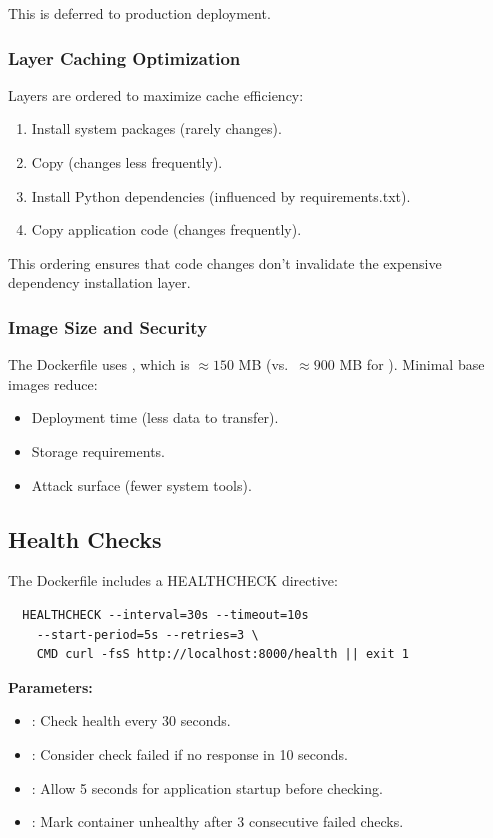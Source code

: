 This is deferred to production deployment.

\subsubsection{Layer Caching Optimization}

Layers are ordered to maximize cache efficiency:

\begin{enumerate}
  \item Install system packages (rarely changes).
  \item Copy  (changes less frequently).
  \item Install Python dependencies (influenced by requirements.txt).
  \item Copy application code (changes frequently).
\end{enumerate}

This ordering ensures that code changes don't invalidate the expensive dependency installation layer.

\subsubsection{Image Size and Security}

The Dockerfile uses , which is $\approx 150$ MB (vs.~$\approx 900$ MB for ). 
Minimal base images reduce:

\begin{itemize}
  \item Deployment time (less data to transfer).
  \item Storage requirements.
  \item Attack surface (fewer system tools).
\end{itemize}

\subsection{Health Checks}

The Dockerfile includes a HEALTHCHECK directive:

\begin{verbatim}
  HEALTHCHECK --interval=30s --timeout=10s 
    --start-period=5s --retries=3 \
    CMD curl -fsS http://localhost:8000/health || exit 1
\end{verbatim}

\textbf{Parameters:}
\begin{itemize}
  \item {}: Check health every 30 seconds.
  \item {}: Consider check failed if no response in 10 seconds.
  \item \code{--start-period=5s}: Allow 5 seconds for application startup before checking.
  \item \code{--retries=3}: Mark container unhealthy after 3 consecutive failed checks.
\end{itemize}


